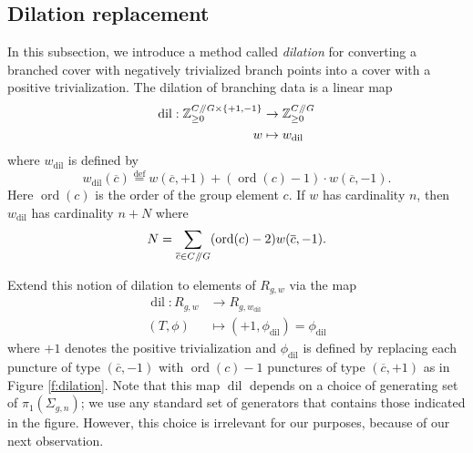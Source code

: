 \documentclass[10pt,twocolumn,amsmath,amssymb,aps,pra,secnumarabic,
    nofootinbib,groupedaddress]{revtex4-1}
\newcommand{\defeq}{\stackrel{\mathrm{def}}=}
\newcommand{\sslash}{\mathbin{/\mkern-5mu/}}
\newcommand{\ord}{\operatorname{ord}}
\newcommand{\dil}{\operatorname{dil}}
\begin{document}
\subsection{Dilation replacement}
\label{ss:dilation}
In this subsection, we introduce a method called \emph{dilation} for converting a branched cover with negatively trivialized branch points into a cover with a positive trivialization.  The dilation of branching data is a linear map
\[ \begin{aligned}
\dil: \mathbb{Z}_{\ge 0}^{C\sslash G \times \{+1,-1\}} &\to \mathbb{Z}_{\ge 0}^{C\sslash G} \\
w &\mapsto w_{\dil}
\end{aligned} \]
where $w_{\dil}$ is defined by
\[ w_{\dil}(\overline{c}) \defeq w(\overline{c},+1) + (\ord(c)-1) \cdot w(\overline{c},-1). \]
Here $\ord(c)$ is the order of the group element $c$.  If $w$ has cardinality $n$, then $w_{\dil}$ has cardinality $n+N$ where
\[ N = \sum_{\overline{c} \in C\sslash G} (\ord(c)-2)w(\overline{c},-1). \]

Extend this notion of dilation to elements of $R_{g,w}$ via the map
\[ \begin{aligned}
\dil: R_{g,w} &\to R_{g,w_{\dil}} \\
(T,\phi) &\mapsto (+1,\phi_{\dil}) = \phi_{\dil}
\end{aligned} \]
where $+1$ denotes the positive trivialization and $\phi_{\dil}$ is defined by replacing each puncture of type $(\overline{c},-1)$ with $\ord(c)-1$ punctures of type $(\overline{c},+1)$ as in Figure \ref{f:dilation}.  Note that this map $\dil$ depends on a choice of generating set of $\pi_1(\Sigma_{g,n})$; we use any standard set of generators that contains those indicated in the figure.  However, this choice is irrelevant for our purposes, because of our next observation.
\end{document}
